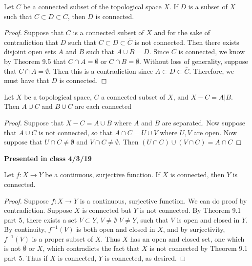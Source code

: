 \documentclass[a4paper,12pt,twoside]{hmcpset}
\begin{document}
\begin{problem}[Theorem 9.6]
    Let $C$ be a connected subset of the topological space $X$. If $D$
    is a subset of $X$ such that $C \subset D \subset \overline{C}$,
    then $D$ is connected.
\end{problem}

\begin{proof}
    Suppose that $C$ is a connected subset of $X$ and for the sake of
    contradiction that $D$ such that $C \subset D \subset 
    \overline{C}$ is not connected. Then there exists disjoint open
    sets $A$ and $B$ such that $A \cup B = D$. 
    Since $C$ is connected, we know by Theorem 9.5 that $C \cap A  =
    \emptyset$ or $C \cap B = \emptyset$. Without loss of generality,
    suppose that $C \cap A = \emptyset$. Then this is a contradiction
    since $A \subset D \subset \overline{C}$. Therefore, we must have
    that $D$ is connected. 
\end{proof}  

\begin{problem}[Theorem 9.8]
    Let $X$ be a topological space, $C$ a connected subset of $X$, and
    $X - C = A\big| B$. Then $A \cup C$ and $B \cup C$ are each
    connected 
\end{problem}

\begin{proof}
    Suppose that $X - C = A \cup B$ where $A$ and $B$ are separated.
    Now suppose that $A \cup C$ is not connected, so that 
    $A \cap C = U \cup V$ where $U, V$ are open. Now suppose that 
    $U \cap C \ne \emptyset$ and $V \cap C \ne \emptyset$. Then $(U
    \cap C) \cup (V \cap C) = A \cap C$ 
\end{proof}

\noindent
\textbf{Presented in class 4/3/19}\\
\begin{problem}[Theorem 9.12]
    Let $f: X \to Y$ be a continuous, surjective function. If $X$ is
    connected, then $Y$ is connected. 
\end{problem}

\begin{proof}
    Suppose $f: X \to Y$ is a continuous, surjective function. We can
    do proof by contradiction. Suppose $X$ is connected but
    $Y$ is not connected. By Theorem 9.1 part 5, there exists a set $V
    \subset Y$, $V \ne \emptyset$ $V \ne Y$, such
    that $V$ is open and closed in $Y$. By continuity, $f^{-1}(V)$
    is both open and closed in $X$, and by surjectivity, $f^{-1}(V)$
    is a proper subset of $X$. Thus $X$ has an open and closed set,
    one which is not $\emptyset$ or $X$, which contradicts the fact that
    $X$ is not connected by
    Theorem 9.1 part 5. Thus if $X$ is connected, $Y$
    is connected, as desired.
\end{proof}
\end{document}
